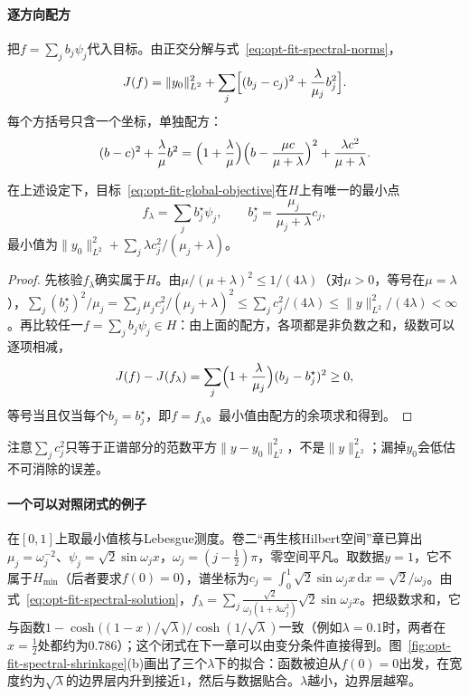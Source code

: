 \paragraph{逐方向配方}
把$f=\sum_jb_j\psi_j$代入目标。由正交分解与式~\eqref{eq:opt-fit-spectral-norms}，
\[
  J(f)=\|y_0\|_{L^2}^2+\sum_j\Bigl[(b_j-c_j)^2+\frac\lambda{\mu_j}b_j^2\Bigr].
\]
每个方括号只含一个坐标，单独配方：
\[
  (b-c)^2+\frac\lambda\mu b^2=\Bigl(1+\frac\lambda\mu\Bigr)\Bigl(b-\frac{\mu c}{\mu+\lambda}\Bigr)^2+\frac{\lambda c^2}{\mu+\lambda}.
\]

\begin{theorem}[整体函数值观测下的正则化拟合]
\label{thm:opt-fit-global-values}
在上述设定下，目标~\eqref{eq:opt-fit-global-objective}在$H$上有唯一的最小点
\begin{equation}
  f_\lambda=\sum_jb_j^\star\psi_j,\qquad b_j^\star=\frac{\mu_j}{\mu_j+\lambda}c_j ,
  \label{eq:opt-fit-spectral-solution}
\end{equation}
最小值为$\|y_0\|_{L^2}^2+\sum_j\lambda c_j^2/(\mu_j+\lambda)$。
\end{theorem}

\begin{proof}
先核验$f_\lambda$确实属于$H$。由$\mu/(\mu+\lambda)^2\le1/(4\lambda)$（对$\mu>0$，等号在$\mu=\lambda$），$\sum_j(b_j^\star)^2/\mu_j=\sum_j\mu_jc_j^2/(\mu_j+\lambda)^2\le\sum_jc_j^2/(4\lambda)\le\|y\|_{L^2}^2/(4\lambda)<\infty$。再比较任一$f=\sum_jb_j\psi_j\in H$：由上面的配方，各项都是非负数之和，级数可以逐项相减，
\[
  J(f)-J(f_\lambda)=\sum_j\Bigl(1+\frac\lambda{\mu_j}\Bigr)(b_j-b_j^\star)^2\ge0,
\]
等号当且仅当每个$b_j=b_j^\star$，即$f=f_\lambda$。最小值由配方的余项求和得到。
\end{proof}

注意$\sum_jc_j^2$只等于正谱部分的范数平方$\|y-y_0\|_{L^2}^2$，不是$\|y\|_{L^2}^2$；漏掉$y_0$会低估不可消除的误差。

\paragraph{一个可以对照闭式的例子}
在$[0,1]$上取最小值核与Lebesgue测度。卷二“再生核Hilbert空间”章已算出$\mu_j=\omega_j^{-2}$、$\psi_j=\sqrt2\sin\omega_jx$，$\omega_j=(j-\tfrac12)\pi$，零空间平凡。取数据$y=1$，它不属于$H_{\min}$（后者要求$f(0)=0$），谱坐标为$c_j=\int_0^1\sqrt2\sin\omega_jx\,\mathrm dx=\sqrt2/\omega_j$。由式~\eqref{eq:opt-fit-spectral-solution}，$f_\lambda=\sum_j\frac{\sqrt2}{\omega_j(1+\lambda\omega_j^2)}\sqrt2\sin\omega_jx$。把级数求和，它与函数$1-\cosh\bigl((1-x)/\sqrt\lambda\bigr)/\cosh(1/\sqrt\lambda)$一致（例如$\lambda=0.1$时，两者在$x=\tfrac12$处都约为$0.786$）；这个闭式在下一章可以由变分条件直接得到。图~\ref{fig:opt-fit-spectral-shrinkage}(b)画出了三个$\lambda$下的拟合：函数被迫从$f(0)=0$出发，在宽度约为$\sqrt\lambda$的边界层内升到接近$1$，然后与数据贴合。$\lambda$越小，边界层越窄。

